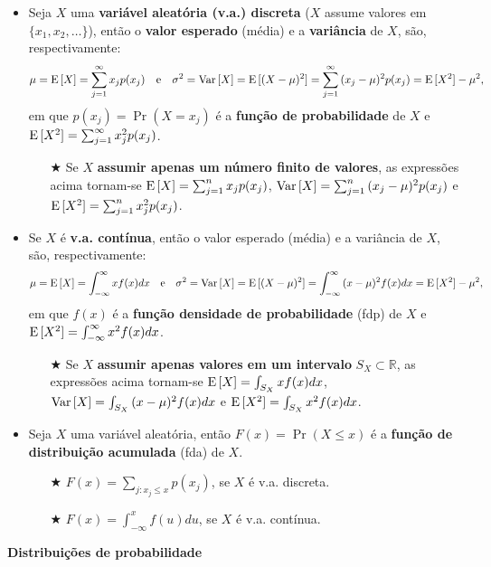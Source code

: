 \documentclass[10pt]{article}%
\def\Var{{\rm Var}\,}
\def\E{{\rm E}\,}
\begin{document}
\begin{itemize}%
\item Seja $X$ uma {\bf variável aleatória (v.a.) discreta} ($X$ assume valores em $\{x_1,x_2,\ldots\}$), então o {\bf valor esperado} (média) e a {\bf variância} de $X$, são, respectivamente:
$$
\mu = \E[X] = \sum_{j=1}^{\infty}{x_j p(x_j)}\quad\mbox{e}\quad \sigma^2 = \Var[X] = \E[(X - \mu)^2] = \sum_{j=1}^{\infty}{(x_j - \mu)^2 p(x_j)} = \E[X^2] - \mu^2,
$$
em que $p(x_j) = \Pr(X = x_j)$ é a {\bf função de probabilidade} de $X$ e $\E[X^2] = \sum_{j=1}^{\infty}{x_j^2 p(x_j)}$.
\begin{itemize}
\item[$\bigstar$] Se $X$ {\bf assumir apenas um número finito de valores}, as expressões acima tornam-se $\E[X] = \sum_{j=1}^{n}{x_j p(x_j)}$, $\Var[X] = \sum_{j=1}^{n}{(x_j - \mu)^2 p(x_j)}$ e $\E[X^2] = \sum_{j=1}^{n}{x_j^2 p(x_j)}$.
\end{itemize}
\item Se $X$ é {\bf v.a. contínua}, então o valor esperado (média) e a variância de $X$, são, respectivamente:
$$
\mu = \E[X] = \int_{-\infty}^{\infty}{xf(x)dx}\quad\mbox{e}\quad \sigma^2 = \Var[X] = \E[(X - \mu)^2] = \int_{-\infty}^{\infty}{(x - \mu)^2 f(x)dx} = \E[X^2] - \mu^2,
$$
em que $f(x)$ é a {\bf função densidade de probabilidade} (fdp) de $X$ e $\E[X^2] = \int_{-\infty}^{\infty}{x^2f(x)dx}$.
\begin{itemize}
\item[$\bigstar$] Se $X$ {\bf assumir apenas valores em um intervalo} $S_X \subset \mathbb{R}$, as expressões acima tornam-se $\E[X] = \int_{S_X}{xf(x)dx}$, $\Var[X] = \int_{S_X}{(x - \mu)^2f(x)dx}$ e $\E[X^2] = \int_{S_X}{x^2f(x)dx}$.
\end{itemize}
\item Seja $X$ uma variável aleatória, então $F(x) = \Pr(X\leq x)$ é a {\bf função de distribuição acumulada} (fda) de $X$.
\begin{itemize}
\item[$\bigstar$] $\displaystyle{F(x) = \sum_{j:x_j\leq x}{p(x_j)}}$, se $X$ é v.a. discreta.
\item[$\bigstar$] $\displaystyle{F(x) = \int_{-\infty}^x{f(u)du}}$, se $X$ é v.a. contínua.
\end{itemize}
\end{itemize}

\textbf{Distribuições de probabilidade}
\end{document}
